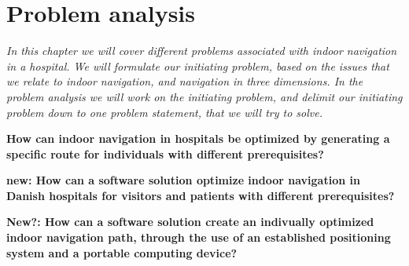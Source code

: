\chapter{Problem analysis}

\textit{In this chapter we will cover different problems associated with indoor navigation in a hospital. We will formulate our initiating problem, based on the issues that we relate to indoor navigation, and navigation in three dimensions. In the problem analysis we will work on the initiating problem, and delimit our initiating problem down to one problem statement, that we will try to solve.
}

\textbf{How can indoor navigation in hospitals be optimized by generating a specific route for individuals with different prerequisites?}

\textbf{new: How can a software solution optimize indoor navigation in Danish hospitals for visitors and patients with different prerequisites?}

\textbf{New?: How can a software solution create an indivually optimized indoor navigation path, through the use of an established positioning system and a portable computing device?}
  









%
